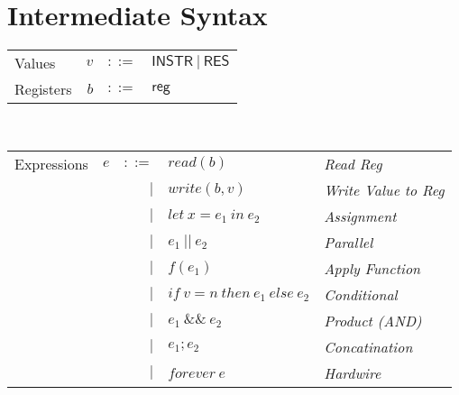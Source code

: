 \documentclass[12pt, letterpaper]{article}
\begin{document}
\newpage
\section{Intermediate Syntax}

    \begin{tabular}{l r c l}
        Values        & $v$     & $::=$     & $\mathsf{INSTR\ |\ RES}$\\
        Registers     & $b$     & $::=$     & $\mathsf{reg}$
    \end{tabular}\\

    \begin{tabular}{l c r l l}
       Expressions  & $e$    & $::=$  & $read(b)$       
                             & \textit{Read Reg}\\
                    &        & $\mid$ & $write(b,v)$    
                             & \textit{Write Value to Reg}\\
                    &        & $\mid$ & $let\ x = e_1\ in\ e_2$ 
                             & \textit{Assignment}\\  
                    &        & $\mid$ & $e_1\ ||\ e_2$ 
                             & \textit{Parallel}\\
                    &        & $\mid$ & $f(e_1)$        
                             & \textit{Apply Function} \\  
                    &        & $\mid$ & $if\ v = n\ then\ e_1\ else\ e_2$
                             & \textit{Conditional} \\
                    &        & $\mid$ & $e_1\ \&\&\ e_2$ 
                             & \textit{Product (AND)}\\
                    &        & $\mid$ & $e_1 ; e_2$
                             & \textit{Concatination}\\
                    &        & $\mid$ & $forever\ e$ 
                             & \textit{Hardwire}
    \end{tabular}


\newpage
\end{document}
